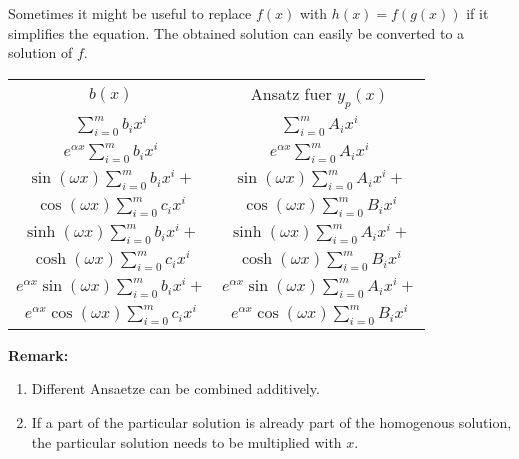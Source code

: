 \begin{remark}
	Sometimes it might be useful to replace $f(x)$ with $h(x) = f(g(x))$ if it simplifies the equation.
	The obtained solution can easily be converted to a solution of $f$.
\end{remark}

\begin{concept}
	\begin{tabular}{| c | c |}
		\hline
		$b(x)$							&	Ansatz fuer $y_p(x)$ \\
		\hhline
		$\sum_{i=0}^m b_i x^i$					&	$\sum_{i=0}^m A_i x^i$ \\
		\hline
		$e^{\alpha x} \sum_{i=0}^m b_i x^i$			&	$e^{\alpha x} \sum_{i=0}^m A_i x^i$ \\	
		\hline
		$\sin(\omega x) \sum_{i=0}^m b_i x^i +$			&	$\sin(\omega x) \sum_{i=0}^m A_i x^i +$ \\
		$\cos(\omega x) \sum_{i=0}^m c_i x^i$			&	$\cos(\omega x) \sum_{i=0}^m B_i x^i$ \\
		\hline
		$\sinh(\omega x) \sum_{i=0}^m b_i x^i +$		&	$\sinh(\omega x) \sum_{i=0}^m A_i x^i +$ \\
		$\cosh(\omega x) \sum_{i=0}^m c_i x^i$			&	$\cosh(\omega x) \sum_{i=0}^m B_i x^i$ \\
		\hline
		$e^{\alpha x} \sin(\omega x) \sum_{i=0}^m b_i x^i +$	&	$e^{\alpha x} \sin(\omega x) \sum_{i=0}^m A_i x^i +$ \\
		$e^{\alpha x} \cos(\omega x) \sum_{i=0}^m c_i x^i$		&	$e^{\alpha x} \cos(\omega x) \sum_{i=0}^m B_i x^i$ \\
		\hline
	\end{tabular}
	$ $\\
	\textbf{Remark:}
	\begin{enumerate}
		\item Different Ansaetze can be combined additively.
		\item If a part of the particular solution is already part of the homogenous solution, the particular solution needs to be multiplied with $x$. 
	\end{enumerate}
\end{concept}


